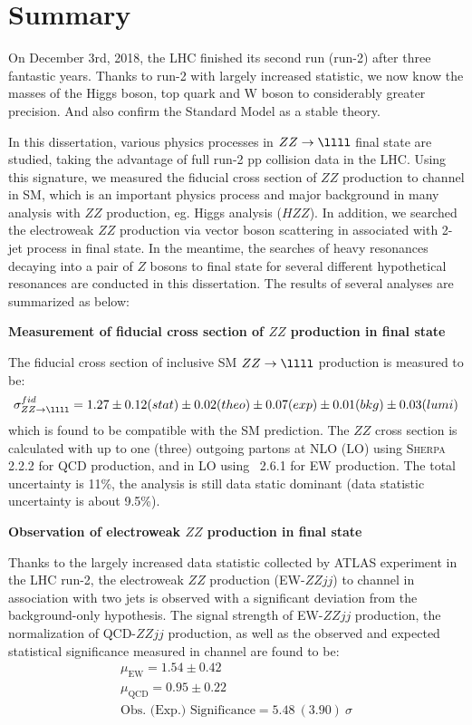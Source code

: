 \chapter{Summary}

On December 3rd, 2018, the LHC finished its second run (run-2) after three fantastic years.
Thanks to run-2 with largely increased statistic, we now know the masses of the Higgs boson, top quark and W boson to considerably greater precision. 
And also confirm the Standard Model as a stable theory.

In this dissertation, various physics processes in $ZZ \rightarrow \llll$ final state are studied, taking the advantage of full run-2 pp collision data in the LHC.
Using this signature, we measured the fiducial cross section of $ZZ$ production to \lllljj channel in SM, which is an important physics process and major background in many analysis with $ZZ$ production, eg. Higgs analysis ($HZZ$).
In addition, we searched the electroweak $ZZ$ production via vector boson scattering in associated with 2-jet process in \llll final state.
In the meantime, the searches of heavy resonances decaying into a pair of $Z$ bosons to \llll final state for several different hypothetical resonances are conducted in this dissertation.
The results of several analyses are summarized as below:

\textbf{Measurement of fiducial cross section of $ZZ$ production in \lllljj final state}

The fiducial cross section of inclusive SM $ZZ \rightarrow \llll$ production is measured to be:
\begin{equation}
	\sigma^{fid}_{ZZ\rightarrow\llll} = 1.27 \pm 0.12 (stat) \pm 0.02 (theo) \pm 0.07 (exp) \pm 0.01 (bkg) \pm 0.03 (lumi)
\end{equation}
which is found to be compatible with the SM prediction.
The $ZZ$ cross section is calculated with up to one (three) outgoing partons at NLO (LO) using \textsc{Sherpa} 2.2.2 for QCD production,
and in LO using \MGMCatNLO~2.6.1 for EW production.
The total uncertainty is 11\%, the analysis is still data static dominant (data statistic uncertainty is about 9.5\%).

\textbf{Observation of electroweak $ZZ$ production in \lllljj final state}

Thanks to the largely increased data statistic collected by ATLAS experiment in the LHC run-2, 
the electroweak $ZZ$ production (EW-$ZZjj$) to \llll channel in association with two jets is observed with a significant deviation from the background-only hypothesis.
The signal strength of EW-$ZZjj$ production, the normalization of QCD-$ZZjj$ production, as well as the observed and expected statistical significance measured in \lllljj channel are found to be:
\begin{equation}
\begin{split}
	\mu_{\mathrm{EW}} = 1.54 \pm 0.42 \\
	\mu_{\mathrm{QCD}} = 0.95 \pm 0.22 \\
	\text{Obs. (Exp.) Significance} = 5.48~(3.90)~\sigma
\end{split}
\end{equation}

